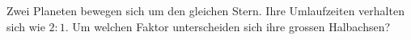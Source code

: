 Zwei Planeten bewegen sich um den gleichen Stern. Ihre Umlaufzeiten verhalten sich wie $2:1$. Um welchen Faktor unterscheiden sich ihre grossen Halbachsen?

